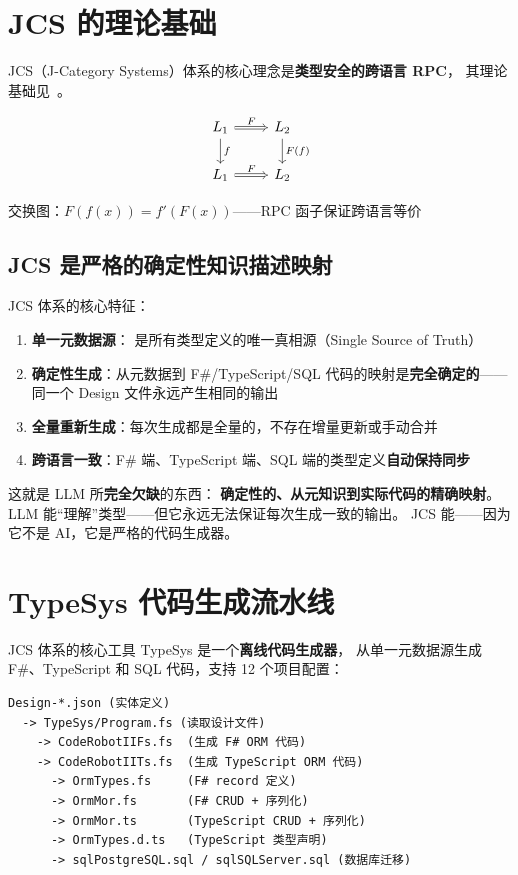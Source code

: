 \documentclass[10pt, openany]{book}
\begin{document}
\section{JCS 的理论基础}

JCS（J-Category Systems）体系的核心理念是\textbf{类型安全的跨语言 RPC}，
其理论基础见~\cite{Chen2024RPCFunctor}。

\[
\begin{tikzcd}
    L_1 \arrow[r, "F", Rightarrow] \arrow[d, "f"] & L_2 \arrow[d, "F(f)"] \\
    L_1 \arrow[r, "F", Rightarrow] & L_2
\end{tikzcd}
\]
\centerline{交换图：\(F(f(x)) = f'(F(x))\)——RPC 函子保证跨语言等价~\cite{MacLane1971}}

\subsection{JCS 是严格的确定性知识描述映射}

JCS 体系的核心特征：
\begin{enumerate}
    \item \textbf{单一元数据源}： 是所有类型定义的唯一真相源（Single Source of Truth）
    \item \textbf{确定性生成}：从元数据到 F\#/TypeScript/SQL 代码的映射是\textbf{完全确定的}——同一个 Design 文件永远产生相同的输出
    \item \textbf{全量重新生成}：每次生成都是全量的，不存在增量更新或手动合并
    \item \textbf{跨语言一致}：F\# 端、TypeScript 端、SQL 端的类型定义\textbf{自动保持同步}
\end{enumerate}

这就是 LLM 所\textbf{完全欠缺}的东西：
\textbf{确定性的、从元知识到实际代码的精确映射}。
LLM 能``理解''类型——但它永远无法保证每次生成一致的输出。
JCS 能——因为它不是 AI，它是严格的代码生成器。

\section{TypeSys 代码生成流水线}

JCS 体系的核心工具 TypeSys 是一个\textbf{离线代码生成器}，
从单一元数据源生成 F\#、TypeScript 和 SQL 代码，支持 12 个项目配置：

\begin{lstlisting}[style=cmd]
Design-*.json (实体定义)
  -> TypeSys/Program.fs (读取设计文件)
    -> CodeRobotIIFs.fs  (生成 F# ORM 代码)
    -> CodeRobotIITs.fs  (生成 TypeScript ORM 代码)
      -> OrmTypes.fs     (F# record 定义)
      -> OrmMor.fs       (F# CRUD + 序列化)
      -> OrmMor.ts       (TypeScript CRUD + 序列化)
      -> OrmTypes.d.ts   (TypeScript 类型声明)
      -> sqlPostgreSQL.sql / sqlSQLServer.sql (数据库迁移)
\end{lstlisting}
\end{document}
